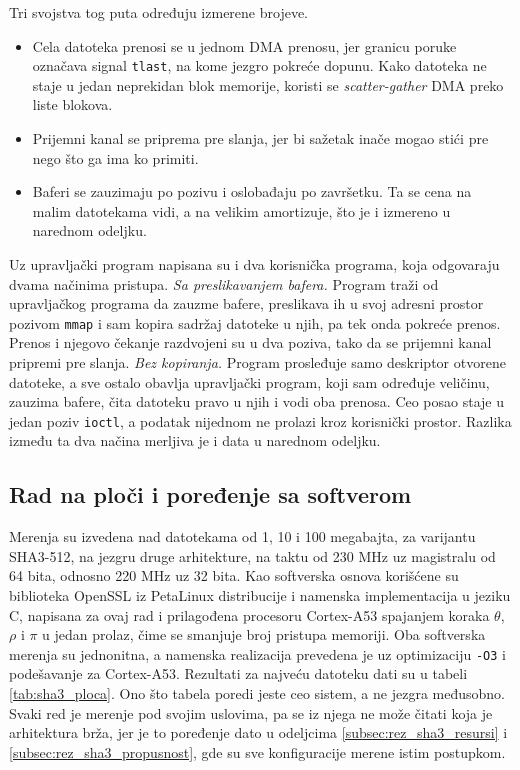 Tri svojstva tog puta određuju izmerene brojeve.
\begin{itemize}[itemsep=2pt]
    \item Cela datoteka prenosi se u jednom DMA prenosu, jer granicu poruke označava signal \texttt{tlast}, na kome jezgro pokreće dopunu. Kako datoteka ne staje u jedan neprekidan blok memorije, koristi se \textit{scatter-gather} DMA preko liste blokova.
    \item Prijemni kanal se priprema pre slanja, jer bi sažetak inače mogao stići pre nego što ga ima ko primiti.
    \item Baferi se zauzimaju po pozivu i oslobađaju po završetku. Ta se cena na malim datotekama vidi, a na velikim amortizuje, što je i izmereno u narednom odeljku.
\end{itemize}

Uz upravljački program napisana su i dva korisnička programa, koja odgovaraju dvama načinima pristupa.
\smallbreak
\textit{Sa preslikavanjem bafera.} Program traži od upravljačkog programa da zauzme bafere, preslikava ih u svoj adresni prostor pozivom \texttt{mmap} i sam kopira sadržaj datoteke u njih, pa tek onda pokreće prenos. Prenos i njegovo čekanje razdvojeni su u dva poziva, tako da se prijemni kanal pripremi pre slanja.
\smallbreak
\textit{Bez kopiranja.} Program prosleđuje samo deskriptor otvorene datoteke, a sve ostalo obavlja upravljački program, koji sam određuje veličinu, zauzima bafere, čita datoteku pravo u njih i vodi oba prenosa. Ceo posao staje u jedan poziv \texttt{ioctl}, a podatak nijednom ne prolazi kroz korisnički prostor.
\smallbreak
Razlika između ta dva načina merljiva je i data u narednom odeljku.

\subsection{Rad na ploči i poređenje sa softverom}
\label{subsec:rez_sha3_ploca}

Merenja su izvedena nad datotekama od 1, 10 i 100 megabajta, za varijantu SHA3-512, na jezgru druge arhitekture, na taktu od 230 MHz uz magistralu od 64 bita, odnosno 220 MHz uz 32 bita. Kao softverska osnova korišćene su biblioteka OpenSSL iz PetaLinux distribucije i namenska implementacija u jeziku C, napisana za ovaj rad i prilagođena procesoru Cortex-A53 spajanjem koraka $\theta$, $\rho$ i $\pi$ u jedan prolaz, čime se smanjuje broj pristupa memoriji. Oba softverska merenja su jednonitna, a namenska realizacija prevedena je uz optimizaciju \texttt{-O3} i podešavanje za Cortex-A53. Rezultati za najveću datoteku dati su u tabeli \ref{tab:sha3_ploca}.
\smallbreak
Ono što tabela poredi jeste ceo sistem, a ne jezgra međusobno. Svaki red je merenje pod svojim uslovima, pa se iz njega ne može čitati koja je arhitektura brža, jer je to poređenje dato u odeljcima \ref{subsec:rez_sha3_resursi} i \ref{subsec:rez_sha3_propusnost}, gde su sve konfiguracije merene istim postupkom.

